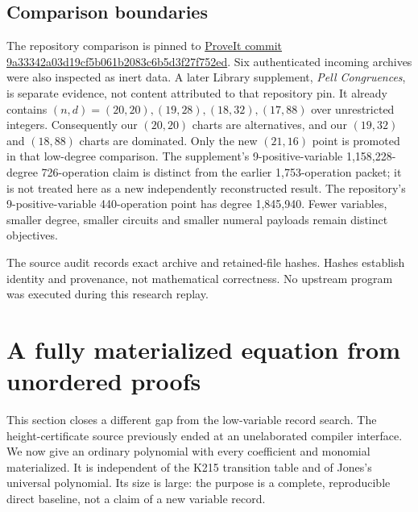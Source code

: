 \documentclass[11pt]{article}
\begin{document}
\subsection{Comparison boundaries}
The repository comparison is pinned to
\href{https://github.com/VladimirReshetnikov/ProveIt/tree/9a33342a03d19cf5b061b2083c6b5d3f27f752ed}{ProveIt commit 9a33342a03d19cf5b061b2083c6b5d3f27f752ed}.
Six authenticated incoming archives were also inspected as inert data.
A later Library supplement, \emph{Pell Congruences}, is separate evidence,
not content attributed to that repository pin. It already contains
$(n,d)=(20,20),(19,28),(18,32),(17,88)$ over unrestricted integers.
Consequently our $(20,20)$ charts are alternatives, and our $(19,32)$ and
$(18,88)$ charts are dominated. Only the new $(21,16)$ point is promoted in
that low-degree comparison. The supplement's 9-positive-variable
1,158,228-degree 726-operation claim is distinct from the earlier
1,753-operation packet; it is not treated here as a new independently
reconstructed result. The repository's 9-positive-variable 440-operation
point has degree 1,845,940. Fewer variables, smaller degree, smaller circuits
and smaller numeral payloads remain distinct objectives.

The source audit records exact archive and retained-file hashes. Hashes
establish identity and provenance, not mathematical correctness. No upstream
program was executed during this research replay.


\section{A fully materialized equation from unordered proofs}
\label{sec:direct-materialized}

This section closes a different gap from the low-variable record search.
The height-certificate source previously ended at an unelaborated compiler
interface. We now give an ordinary polynomial with every coefficient and
monomial materialized. It is independent of the K215 transition table and
of Jones's universal polynomial. Its size is large: the purpose is a
complete, reproducible direct baseline, not a claim of a new variable record.
\end{document}

